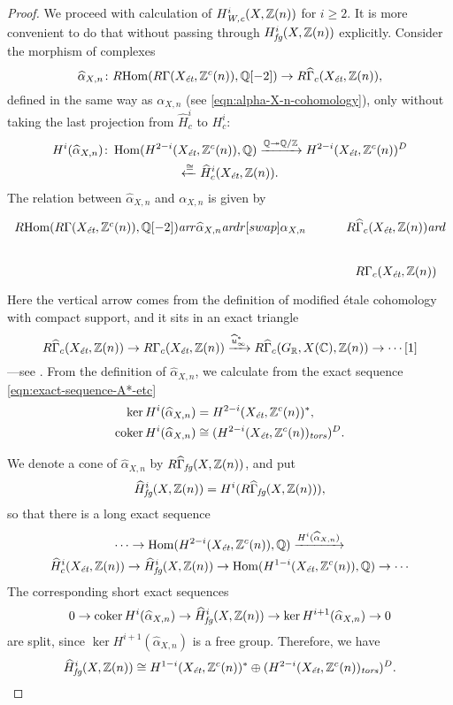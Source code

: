 \documentclass[draft]{article}
\DeclareMathOperator{\coker}{coker}
\DeclareMathOperator{\Hom}{Hom}
\newcommand{\CC}{\mathbb{C}}
\newcommand{\QQ}{\mathbb{Q}}
\newcommand{\RR}{\mathbb{R}}
\newcommand{\ZZ}{\mathbb{Z}}
\newcommand{\ar}{\text{\it ar}}
\newcommand{\et}{\text{\it \'{e}t}}
\newcommand{\fg}{\text{\it fg}}
\newcommand{\tors}{\text{\it tors}}
\newcommand{\Wc}{\text{\it W,c}}
\newcommand{\RHom}{R\!\Hom}
\theoremstyle{myplain}
\theoremstyle{mydefinition}
\numberwithin{equation}{section}
\begin{document}
\begin{proof}
  \vspace{1em}

  We proceed with calculation of $H^i_\Wc (X, \ZZ(n))$ for $i \ge 2$. It is
  more convenient to do that without passing through $H^i_\fg (X, \ZZ(n))$
  explicitly. Consider the morphism of complexes
  \[ \widehat{\alpha}_{X,n}\colon
    \RHom (R\Gamma (X_\et, \ZZ^c(n)), \QQ[-2]) \to
    R\widehat{\Gamma}_c (X_\et, \ZZ(n)), \]
  defined in the same way as $\alpha_{X,n}$
  (see \eqref{eqn:alpha-X-n-cohomology}), only without taking the last
  projection from $\widehat{H}^i_c$ to $H^i_c$:
  \begin{multline*}
    H^i (\widehat{\alpha}_{X,n})\colon \Hom (H^{2-i} (X_\et, \ZZ^c(n)), \QQ)
    \xrightarrow{\QQ \twoheadrightarrow \QQ/\ZZ}
    H^{2-i} (X_\et, \ZZ^c(n))^D \\
    \xleftarrow{\cong} \widehat{H}^i_c (X_\et, \ZZ(n)).
  \end{multline*}
  The relation between $\widehat{\alpha}_{X,n}$ and $\alpha_{X,n}$
  is given by
  \[ \begin{tikzcd}
      \RHom (R\Gamma (X_\et, \ZZ^c(n)), \QQ[-2]) \ar{r}{\widehat{\alpha}_{X,n}}\ar{dr}[swap]{\alpha_{X,n}} & R\widehat{\Gamma}_c (X_\et, \ZZ(n)) \ar{d} \\
      & R\Gamma_c (X_\et, \ZZ(n))
    \end{tikzcd} \]
  Here the vertical arrow comes from the definition of modified \'{e}tale
  cohomology with compact support, and it sits in an exact triangle
  \[ R\widehat{\Gamma}_c (X_\et, \ZZ(n)) \to
    R\Gamma_c (X_\et, \ZZ(n)) \xrightarrow{\widehat{u}^*_\infty}
    R\widehat{\Gamma}_c (G_\RR, X(\CC), \ZZ(n)) \to \cdots [1] \]
  ---see \cite[Lemma~6.14]{Flach-Morin-2018}.
  From the definition of $\widehat{\alpha}_{X,n}$, we calculate
  from the exact sequence \eqref{eqn:exact-sequence-A*-etc}
  \begin{align*}
    \ker H^i (\widehat{\alpha}_{X,n}) & = H^{2-i} (X_\et, \ZZ^c(n))^*, \\
    \coker H^i (\widehat{\alpha}_{X,n}) & \cong (H^{2-i} (X_\et, \ZZ^c (n))_\tors)^D.
  \end{align*}

  We denote a cone of $\widehat{\alpha}_{X,n}$ by
  $R\widehat{\Gamma}_\fg (X, \ZZ(n))$, and put
  $$\widehat{H}^i_\fg (X, \ZZ(n)) = H^i (R\widehat{\Gamma}_\fg (X, \ZZ(n))),$$
  so that there is a long exact sequence
  \begin{multline*}
    \cdots \to \Hom (H^{2-i} (X_\et, \ZZ^c (n)), \QQ) \xrightarrow{H^i (\widehat{\alpha}_{X,n})} \\
    \widehat{H}^i_c (X_\et, \ZZ(n)) \to
    \widehat{H}^i_\fg (X, \ZZ(n)) \to
    \Hom (H^{1-i} (X_\et, \ZZ^c (n)), \QQ) \to \cdots
  \end{multline*}
  The corresponding short exact sequences
  \[ 0 \to \coker H^i (\widehat{\alpha}_{X,n}) \to
    \widehat{H}^i_\fg (X, \ZZ(n)) \to
    \ker H^{i+1} (\widehat{\alpha}_{X,n}) \to 0 \]
  are split, since $\ker H^{i+1} (\widehat{\alpha}_{X,n})$ is a free
  group. Therefore, we have
  \[ \widehat{H}^i_\fg (X, \ZZ(n)) \cong
    H^{1-i} (X_\et, \ZZ^c(n))^*
    \oplus
    (H^{2-i} (X_\et, \ZZ^c (n))_\tors)^D. \]


\end{proof}
\end{document}
